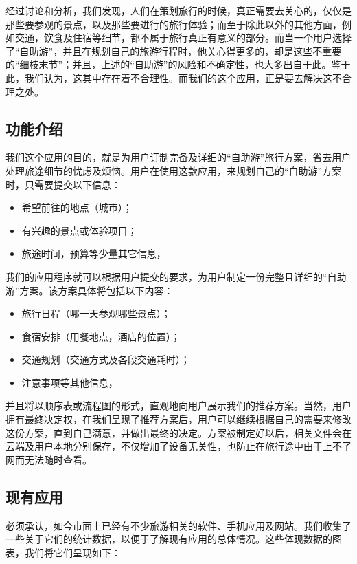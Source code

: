 \documentclass[12pt,a4paper]{article}
\begin{document}
\begin{CJK}{UTF8}{gbsn}
	经过讨论和分析，我们发现，人们在策划旅行的时候，真正需要去关心的，仅仅是那些要参观的景点，以及那些要进行的旅行体验；而至于除此以外的其他方面，例如交通，饮食及住宿等细节\footnotemark，都不属于旅行真正有意义的部分。而当一个用户选择了“自助游”，并且在规划自己的旅游行程时，他关心得更多的，却是这些不重要的“细枝末节”；并且，上述的“自助游”的风险和不确定性，也大多出自于此。鉴于此，我们认为，这其中存在着不合理性。而我们的这个应用，正是要去解决这不合理之处。


	\subsection{功能介绍}
	我们这个应用的目的，就是为用户订制完备及详细的“自助游”旅行方案，省去用户处理旅途细节的忧虑及烦恼。用户在使用这款应用，来规划自己的“自助游”方案时，只需要提交以下信息：
	\begin{itemize}
	\item 希望前往的地点（城市）；
	\item 有兴趣的景点或体验项目；
	\item 旅途时间，预算等少量其它信息，
	\end{itemize}
	我们的应用程序就可以根据用户提交的要求，为用户制定一份完整且详细的“自助游”方案。该方案具体将包括以下内容：
	\begin{itemize}
	\item 旅行日程（哪一天参观哪些景点）；
	\item 食宿安排（用餐地点，酒店的位置）；
	\item 交通规划（交通方式及各段交通耗时）；
	\item 注意事项等其他信息，
	\end{itemize}
	并且将以顺序表或流程图的形式，直观地向用户展示我们的推荐方案。当然，用户拥有最终决定权，在我们呈现了推荐方案后，用户可以继续根据自己的需要来修改这份方案，直到自己满意，并做出最终的决定。方案被制定好以后，相关文件会在云端及用户本地分别保存，不仅增加了设备无关性，也防止在旅行途中由于上不了网而无法随时查看。
	
	\subsection{现有应用}
	必须承认，如今市面上已经有不少旅游相关的软件、手机应用及网站。我们收集了一些关于它们的统计数据，以便于了解现有应用的总体情况。这些体现数据的图表，我们将它们呈现如下：


\end{CJK}
\end{document}
